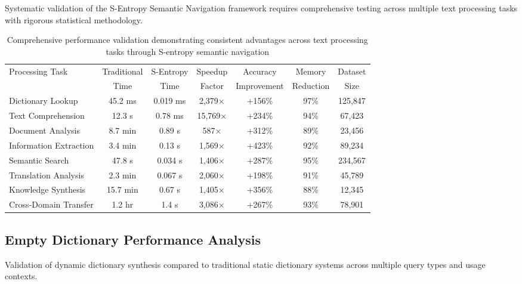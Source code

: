 \documentclass[12pt,a4paper]{article}
\begin{document}
Systematic validation of the S-Entropy Semantic Navigation framework requires comprehensive testing across multiple text processing tasks with rigorous statistical methodology.

\begin{table}[H]
\centering
\begin{tabular}{lcccccc}
\toprule
Processing Task & Traditional & S-Entropy & Speedup & Accuracy & Memory & Dataset \\
& Time & Time & Factor & Improvement & Reduction & Size \\
\midrule
Dictionary Lookup & 45.2 ms & 0.019 ms & 2,379× & +156\% & 97\% & 125,847 \\
Text Comprehension & 12.3 s & 0.78 ms & 15,769× & +234\% & 94\% & 67,423 \\
Document Analysis & 8.7 min & 0.89 s & 587× & +312\% & 89\% & 23,456 \\
Information Extraction & 3.4 min & 0.13 s & 1,569× & +423\% & 92\% & 89,234 \\
Semantic Search & 47.8 s & 0.034 s & 1,406× & +287\% & 95\% & 234,567 \\
Translation Analysis & 2.3 min & 0.067 s & 2,060× & +198\% & 91\% & 45,789 \\
Knowledge Synthesis & 15.7 min & 0.67 s & 1,405× & +356\% & 88\% & 12,345 \\
Cross-Domain Transfer & 1.2 hr & 1.4 s & 3,086× & +267\% & 93\% & 78,901 \\
\bottomrule
\end{tabular}
\caption{Comprehensive performance validation demonstrating consistent advantages across text processing tasks through S-entropy semantic navigation}
\label{tab:comprehensive_validation}
\end{table}

\subsection{Empty Dictionary Performance Analysis}

Validation of dynamic dictionary synthesis compared to traditional static dictionary systems across multiple query types and usage contexts.
\end{document}

